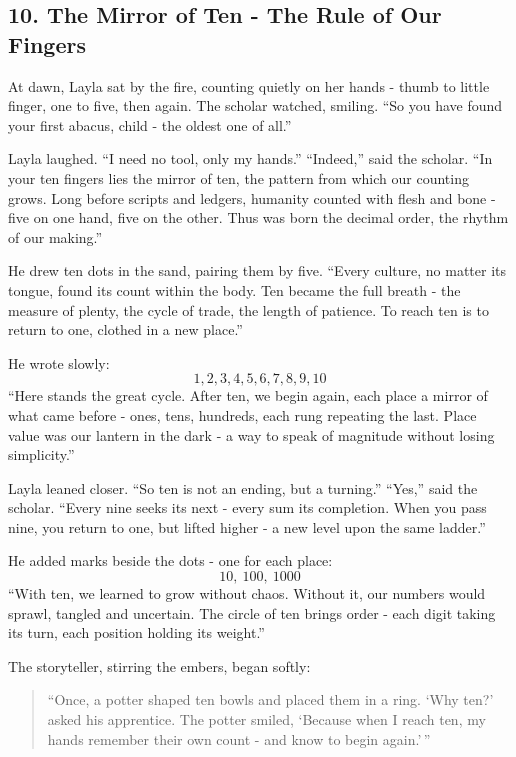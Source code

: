 \documentclass[
  letterpaper,
  DIV=11,
  numbers=noendperiod]{scrreprt}
\begin{document}
\subsection{10. The Mirror of Ten - The Rule of Our
Fingers}\label{the-mirror-of-ten---the-rule-of-our-fingers}

At dawn, Layla sat by the fire, counting quietly on her hands - thumb to
little finger, one to five, then again. The scholar watched, smiling.
``So you have found your first abacus, child - the oldest one of all.''

Layla laughed. ``I need no tool, only my hands.'' ``Indeed,'' said the
scholar. ``In your ten fingers lies the mirror of ten, the pattern from
which our counting grows. Long before scripts and ledgers, humanity
counted with flesh and bone - five on one hand, five on the other. Thus
was born the decimal order, the rhythm of our making.''

He drew ten dots in the sand, pairing them by five. ``Every culture, no
matter its tongue, found its count within the body. Ten became the full
breath - the measure of plenty, the cycle of trade, the length of
patience. To reach ten is to return to one, clothed in a new place.''

He wrote slowly: \[
1, 2, 3, 4, 5, 6, 7, 8, 9, 10
\] ``Here stands the great cycle. After ten, we begin again, each place
a mirror of what came before - ones, tens, hundreds, each rung repeating
the last. Place value was our lantern in the dark - a way to speak of
magnitude without losing simplicity.''

Layla leaned closer. ``So ten is not an ending, but a turning.''
``Yes,'' said the scholar. ``Every nine seeks its next - every sum its
completion. When you pass nine, you return to one, but lifted higher - a
new level upon the same ladder.''

He added marks beside the dots - one for each place: \[
10,\ 100,\ 1000
\] ``With ten, we learned to grow without chaos. Without it, our numbers
would sprawl, tangled and uncertain. The circle of ten brings order -
each digit taking its turn, each position holding its weight.''

The storyteller, stirring the embers, began softly:

\begin{quote}
``Once, a potter shaped ten bowls and placed them in a ring. `Why ten?'
asked his apprentice. The potter smiled, `Because when I reach ten, my
hands remember their own count - and know to begin again.'\,''
\end{quote}
\end{document}
